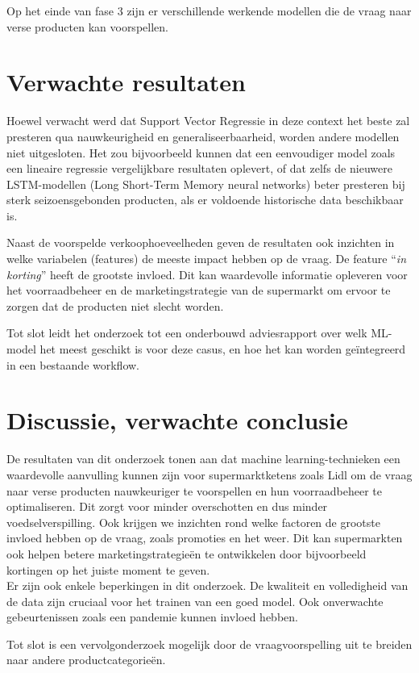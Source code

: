 \documentclass{hogent-article}
\begin{document}
    Op het einde van fase 3 zijn er verschillende werkende modellen die de vraag naar verse producten kan voorspellen.  
    
    \section{Verwachte resultaten}%
    
    \label{sec:verwachte-resultaten}
    
    Hoewel verwacht werd dat Support Vector Regressie in deze context het beste zal presteren qua nauwkeurigheid en generaliseerbaarheid, worden andere modellen niet uitgesloten. Het zou bijvoorbeeld kunnen dat een eenvoudiger model zoals een lineaire regressie vergelijkbare resultaten oplevert, of dat zelfs de nieuwere LSTM-modellen (Long Short-Term Memory neural networks)\autocite{Hochreiter1997} beter presteren bij sterk seizoensgebonden producten, als er voldoende historische data beschikbaar is.
    
    Naast de voorspelde verkoophoeveelheden geven de resultaten ook inzichten in welke variabelen (features) de meeste impact hebben op de vraag. De feature ``\emph{in korting}'' heeft de grootste invloed. Dit kan waardevolle informatie opleveren voor het voorraadbeheer en de marketingstrategie van de supermarkt om ervoor te zorgen dat de producten niet slecht worden.
    
    Tot slot leidt het onderzoek tot een onderbouwd adviesrapport over welk ML-model het meest geschikt is voor deze casus, en hoe het kan worden geïntegreerd in een bestaande workflow.
    
    \section{Discussie, verwachte conclusie}%
    
    \label{sec:discussie-conclusie}
    
    De resultaten van dit onderzoek tonen aan dat machine learning-technieken een waardevolle aanvulling kunnen zijn voor supermarktketens zoals Lidl om de vraag naar verse producten nauwkeuriger te voorspellen en hun voorraadbeheer te optimaliseren. Dit zorgt voor minder overschotten en dus minder voedselverspilling. Ook krijgen we inzichten rond welke factoren de grootste invloed hebben op de vraag, zoals promoties en het weer. Dit kan supermarkten ook helpen betere marketingstrategieën te ontwikkelen door bijvoorbeeld kortingen op het juiste moment te geven. \\
    
    Er zijn ook enkele beperkingen in dit onderzoek. De kwaliteit en volledigheid van de data zijn cruciaal voor het trainen van een goed model. Ook onverwachte gebeurtenissen zoals een pandemie kunnen invloed hebben.
    
    Tot slot is een vervolgonderzoek mogelijk door de vraagvoorspelling uit te breiden naar andere productcategorieën.
    
    \printbibliography[heading=bibintoc]
    
\end{document}

